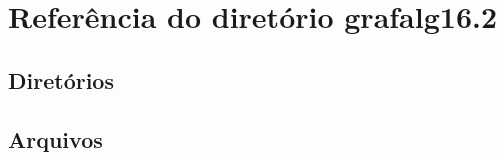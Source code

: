 \section{Referência do diretório grafalg16.2}
\label{dir_98015047146478a335e6ac73db1f8de9}
\subsection*{Diretórios}
\begin{DoxyCompactItemize}
\end{DoxyCompactItemize}
\subsection*{Arquivos}
\begin{DoxyCompactItemize}
\end{DoxyCompactItemize}
